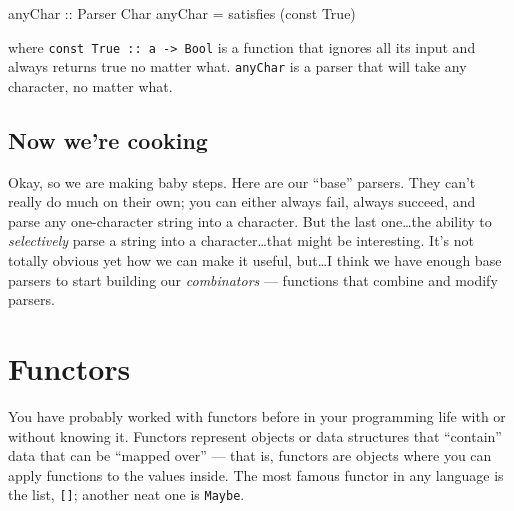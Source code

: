 \documentclass[]{article}
\newenvironment{Shaded}{}{}
\newcommand{\DataTypeTok}[1]{\textcolor[rgb]{0.56,0.13,0.00}{#1}}
\newcommand{\DecValTok}[1]{\textcolor[rgb]{0.25,0.63,0.44}{#1}}
\newcommand{\FunctionTok}[1]{\textcolor[rgb]{0.02,0.16,0.49}{#1}}
\newcommand{\NormalTok}[1]{#1}
\newcommand{\OperatorTok}[1]{\textcolor[rgb]{0.40,0.40,0.40}{#1}}
\newcommand{\OtherTok}[1]{\textcolor[rgb]{0.00,0.44,0.13}{#1}}
\begin{document}
\begin{Shaded}
\begin{Highlighting}[]
\OtherTok{anyChar ::} \DataTypeTok{Parser} \DataTypeTok{Char}
\NormalTok{anyChar }\OtherTok{=}\NormalTok{ satisfies (}\FunctionTok{const} \DataTypeTok{True}\NormalTok{)}
\end{Highlighting}
\end{Shaded}

where \texttt{const\ True\ ::\ a\ -\textgreater{}\ Bool} is a function that
ignores all its input and always returns true no matter what. \texttt{anyChar}
is a parser that will take any character, no matter what.

\subsection{Now we're cooking}\label{now-were-cooking}

Okay, so we are making baby steps. Here are our ``base'' parsers. They can't
really do much on their own; you can either always fail, always succeed, and
parse any one-character string into a character. But the last one\ldots the
ability to \emph{selectively} parse a string into a character\ldots that might
be interesting. It's not totally obvious yet how we can make it useful,
but\ldots I think we have enough base parsers to start building our
\emph{combinators} --- functions that combine and modify parsers.

\section{Functors}\label{functors}

You have probably worked with functors before in your programming life with or
without knowing it. Functors represent objects or data structures that
``contain'' data that can be ``mapped over'' --- that is, functors are objects
where you can apply functions to the values inside. The most famous functor in
any language is the list, \texttt{{[}{]}}; another neat one is \texttt{Maybe}.

\begin{Shaded}
\end{Shaded}
\end{document}

